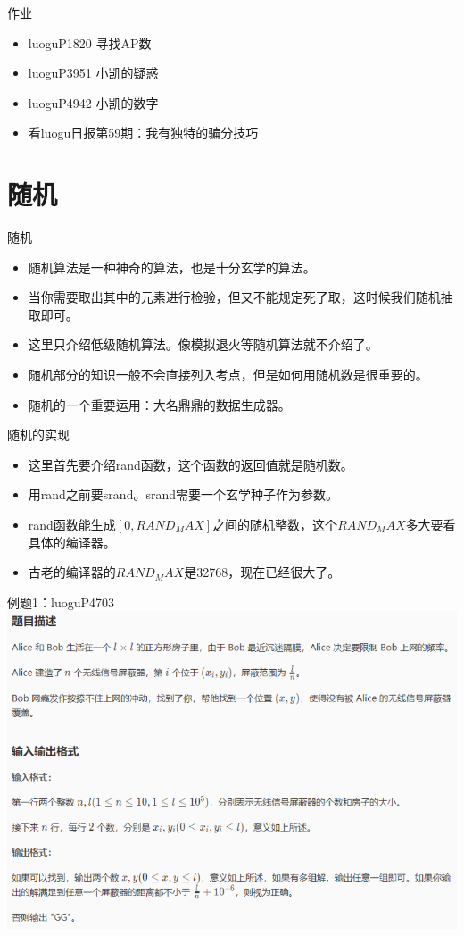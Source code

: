 \documentclass{beamer}[UTF-8]
\begin{document}
\begin{frame}{作业}
 \pause
\begin{itemize}
\item luoguP1820 寻找AP数
\item luoguP3951 小凯的疑惑
\item luoguP4942 小凯的数字
\item 看luogu日报第59期：我有独特的骗分技巧
\end{itemize}
\end{frame}
\section{随机} %

\begin{frame}{随机}
 \pause
\begin{itemize}
\item 随机算法是一种神奇的算法，也是十分玄学的算法。 \pause
\item 当你需要取出其中的元素进行检验，但又不能规定死了取，这时候我们随机抽取即可。 \pause
\item 这里只介绍低级随机算法。像模拟退火等随机算法就不介绍了。  \pause
\item 随机部分的知识一般不会直接列入考点，但是如何用随机数是很重要的。 \pause
\item 随机的一个重要运用：大名鼎鼎的数据生成器。
\end{itemize}
\end{frame}

\begin{frame}{随机的实现}
 \pause
\begin{itemize}
\item 这里首先要介绍rand函数，这个函数的返回值就是随机数。 \pause
\item 用rand之前要srand。srand需要一个玄学种子作为参数。 \pause
\item rand函数能生成$[0,RAND_MAX]$之间的随机整数，这个$RAND_MAX$多大要看具体的编译器。 \pause
\item 古老的编译器的$RAND_MAX$是32768，现在已经很大了。
\end{itemize}
\end{frame}

\begin{frame}{例题1：luoguP4703}
\includegraphics{luoguP4703.png}
\end{frame}
\end{document}
